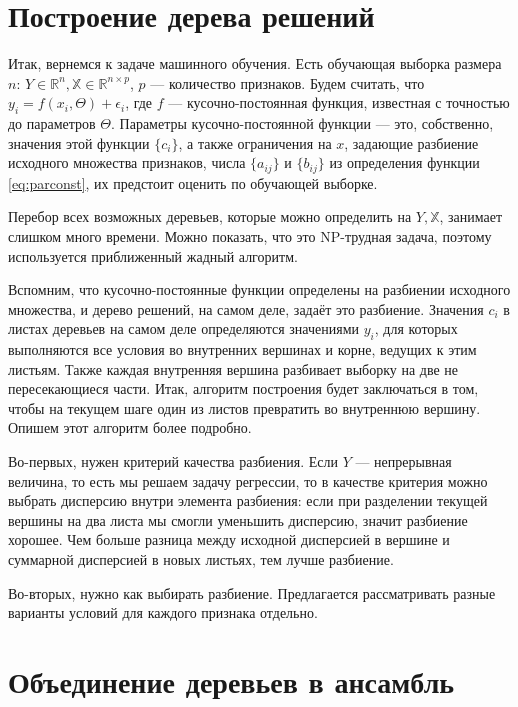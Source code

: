 \documentclass[12pt,a4paper]{article}
\begin{document}
\section{Построение дерева решений}

Итак, вернемся к задаче машинного обучения. Есть обучающая выборка размера $n$: $Y \in \mathbb R ^ n, \mathbb X \in \mathbb R ^ {n \times p}$, $p$ --- количество признаков. Будем считать, что $y_i = f(x_i, \Theta) + \epsilon_i$, где $f$ --- кусочно-постоянная функция, известная с точностью до параметров $\Theta$. Параметры кусочно-постоянной функции --- это, собственно, значения этой функции $\{c_i\}$, а также ограничения на $x$, задающие разбиение исходного множества признаков, числа $\{a_{ij}\}$ и $\{b_{ij}\}$ из определения функции \eqref{eq:parconst}, их предстоит оценить по обучающей выборке.\par

Перебор всех возможных деревьев, которые можно определить на $Y, \mathbb X$, занимает слишком много времени. Можно показать, что это NP-трудная задача, поэтому используется приближенный жадный алгоритм.\par

Вспомним, что кусочно-постоянные функции определены на разбиении исходного множества, и дерево решений, на самом деле, задаёт это разбиение. Значения $c_i$ в листах деревьев на самом деле определяются значениями $y_i$, для которых выполняются все условия во внутренних вершинах и корне, ведущих к этим листьям. Также каждая внутренняя вершина разбивает выборку на две не пересекающиеся части. Итак, алгоритм построения будет заключаться в том, чтобы на текущем шаге один из листов превратить во внутреннюю вершину. Опишем этот алгоритм более подробно.\par

Во-первых, нужен критерий качества разбиения. Если $Y$ --- непрерывная величина, то есть мы решаем задачу регрессии, то в качестве критерия можно выбрать дисперсию внутри элемента разбиения: если при разделении текущей вершины на два листа мы смогли уменьшить дисперсию, значит разбиение хорошее. Чем больше разница между исходной дисперсией в вершине и суммарной дисперсией в новых листьях, тем лучше разбиение.\par

Во-вторых, нужно как выбирать разбиение. Предлагается рассматривать разные варианты условий для каждого признака отдельно.

\section{Объединение деревьев в ансамбль}
\end{document}
